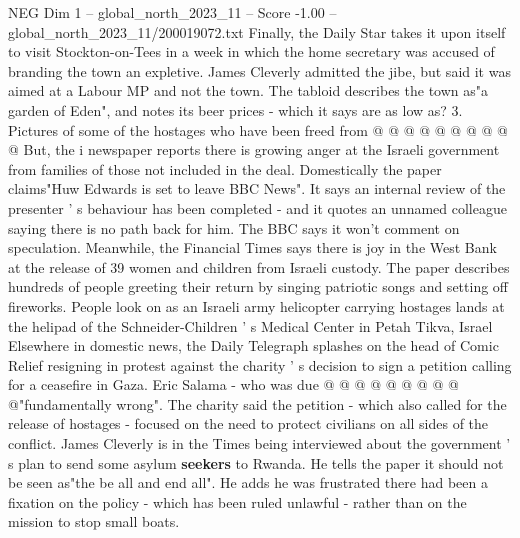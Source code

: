 \begin{textsample}{NEG Dim 1 – global\_north\_2023\_11 – Score -1.00 – global\_north\_2023\_11/200019072.txt}
Finally, the Daily Star takes it upon itself to visit Stockton-on-Tees in a week in which the home secretary was accused of branding the town an expletive.
James Cleverly admitted the jibe, but said it was aimed at a Labour MP and not the town.
The tabloid describes the town as"a garden of Eden", and notes its beer prices - which it says are as low as? 3.
Pictures of some of the hostages who have been freed from @ @ @ @ @ @ @ @ @ @ But, the i newspaper reports there is growing anger at the Israeli government from families of those not included in the deal.
Domestically the paper claims"Huw Edwards is set to leave BBC News".
It says an internal review of the presenter ' s behaviour has been completed - and it quotes an unnamed colleague saying there is no path back for him.
The BBC says it won't comment on speculation.
Meanwhile, the Financial Times says there is joy in the West Bank at the release of 39 women and children from Israeli custody.
The paper describes hundreds of people greeting their return by singing patriotic songs and setting off fireworks.
People look on as an Israeli army helicopter carrying hostages lands at the helipad of the Schneider-Children ' s Medical Center in Petah Tikva, Israel Elsewhere in domestic news, the Daily Telegraph splashes on the head of Comic Relief resigning in protest against the charity ' s decision to sign a petition calling for a ceasefire in Gaza.
Eric Salama - who was due @ @ @ @ @ @ @ @ @ @"fundamentally wrong".
The charity said the petition - which also called for the release of hostages - focused on the need to protect civilians on all sides of the conflict.
James Cleverly is in the Times being interviewed about the government ' s plan to send some asylum \textbf{seekers} to Rwanda.
He tells the paper it should not be seen as"the be all and end all".
He adds he was frustrated there had been a fixation on the policy - which has been ruled unlawful - rather than on the mission to stop small boats.

\end{textsample}
